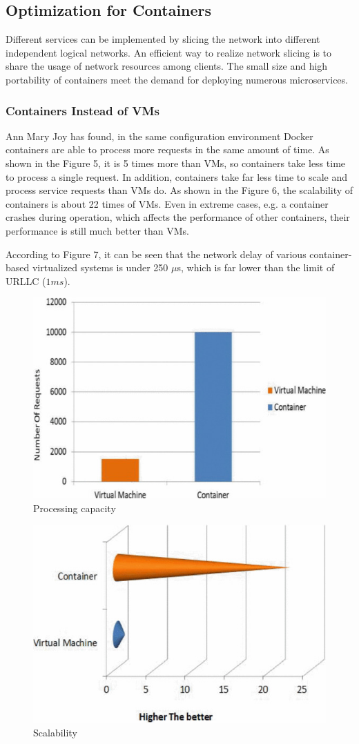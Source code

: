 \subsection{Optimization for Containers}
Different services can be implemented by slicing the network into different
independent logical networks\cite{b10}.
An efficient way to realize network slicing is to share the usage of network resources
among clients.
The small size and high portability of containers meet the demand for deploying numerous
microservices.

\subsubsection{Containers Instead of VMs}
Ann Mary Joy has found\cite{b15}, in the same configuration environment
Docker containers are able to process more requests in the same amount of time.
As shown in the Figure 5, it is 5 times more than VMs, so containers take
less time to process a single request.
In addition, containers take far less time to scale and process service requests than VMs do.
As shown in the Figure 6, the scalability of containers is about 22 times of VMs. Even in
extreme cases, e.g. a container crashes during operation, which affects the performance
of other containers, their performance is still much better than VMs\cite{b7}.

According to Figure 7, it can be seen that the network delay of various container-based
virtualized systems is under 250 {$\mu$s}, which is far lower than the limit of URLLC ($\si{1}{ms}$).

\begin{figure}[h!]
    \centering
    \includegraphics[width=.3\textwidth]{pics/Optimization3}
    \caption{Processing capacity\cite{b15}}
\end{figure}

\begin{figure}[h!]
    \centering
    \includegraphics[width=.3\textwidth]{pics/Optimization4}
    \caption{Scalability\cite{b15}}
\end{figure}

